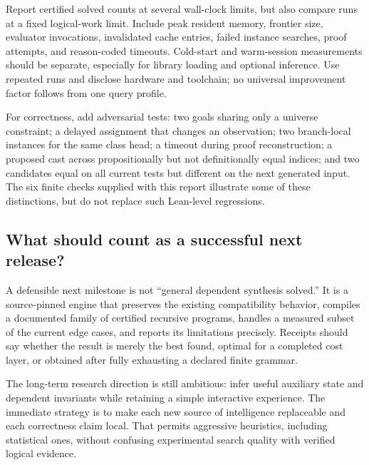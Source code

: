Report certified solved counts at several wall-clock limits, but also compare runs at a fixed logical-work limit. Include peak resident memory, frontier size, evaluator invocations, invalidated cache entries, failed instance searches, proof attempts, and reason-coded timeouts. Cold-start and warm-session measurements should be separate, especially for library loading and optional inference. Use repeated runs and disclose hardware and toolchain; no universal improvement factor follows from one query profile.

For correctness, add adversarial tests: two goals sharing only a universe constraint; a delayed assignment that changes an observation; two branch-local instances for the same class head; a timeout during proof reconstruction; a proposed cast across propositionally but not definitionally equal indices; and two candidates equal on all current tests but different on the next generated input. The six finite checks supplied with this report illustrate some of these distinctions, but do not replace such Lean-level regressions.

\subsection{What should count as a successful next release?}

A defensible next milestone is not ``general dependent synthesis solved.'' It is a source-pinned engine that preserves the existing compatibility behavior, compiles a documented family of certified recursive programs, handles a measured subset of the current edge cases, and reports its limitations precisely. Receipts should say whether the result is merely the best found, optimal for a completed cost layer, or obtained after fully exhausting a declared finite grammar.

The long-term research direction is still ambitious: infer useful auxiliary state and dependent invariants while retaining a simple interactive experience. The immediate strategy is to make each new source of intelligence replaceable and each correctness claim local. That permits aggressive heuristics, including statistical ones, without confusing experimental search quality with verified logical evidence.
